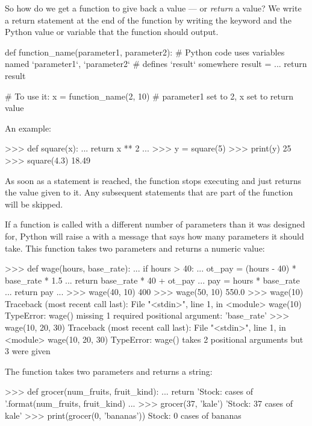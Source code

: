 \documentclass[11pt]{cselabheader}
\begin{document}
{So how do we get a function to give back a value --- or \emph{return} a value? We write
a return statement at the end of the function
by writing the  keyword and the Python value or variable
that the function should output.

\begin{python3code}
def function_name(parameter1, parameter2):
    # Python code uses variables named `parameter1`, `parameter2`
    # defines `result` somewhere
    result = ...
    return result

# To use it:
x = function_name(2, 10)  # parameter1 set to 2, x set to return value
\end{python3code}

An example:

\begin{pyconcode}
>>> def square(x):
...     return x ** 2
...
>>> y = square(5)
>>> print(y)
25
>>> square(4.3)
18.49

\end{pyconcode}

As soon as a  statement is reached, the function stops
executing and just returns the value given to it. Any subsequent statements that
are part of the function will be skipped.

If a function is called with a different number of parameters
than it was designed for, Python will raise a 
with a message that says how many parameters it should take.
This function takes two parameters and returns a numeric value:

\begin{pyconcode}
>>> def wage(hours, base_rate):
...     if hours > 40:
...         ot_pay = (hours - 40) * base_rate * 1.5
...         return base_rate * 40 + ot_pay
...     pay = hours * base_rate
...     return pay
...
>>> wage(40, 10)
400
>>> wage(50, 10)
550.0
>>> wage(10)
Traceback (most recent call last):
  File "<stdin>", line 1, in <module>
    wage(10)
TypeError: wage() missing 1 required positional argument: 'base_rate'
>>> wage(10, 20, 30)
Traceback (most recent call last):
  File "<stdin>", line 1, in <module>
    wage(10, 20, 30)
TypeError: wage() takes 2 positional arguments but 3 were given

\end{pyconcode}

The  function takes two parameters and returns a string:

\begin{pyconcode}
>>> def grocer(num_fruits, fruit_kind):
...     return 'Stock: {} cases of {}'.format(num_fruits, fruit_kind)
...
>>> grocer(37, 'kale')
'Stock: 37 cases of kale'
>>> print(grocer(0, 'bananas'))
Stock: 0 cases of bananas


\end{pyconcode}}
\end{document}
